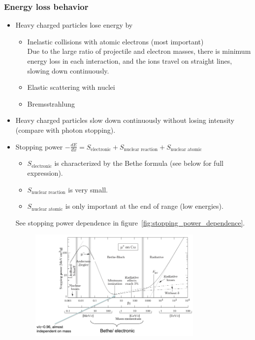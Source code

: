 \subsubsection{Energy loss behavior}
\begin{itemize}
    \item Heavy charged particles lose energy by
    \begin{itemize}
        \item Inelastic collisions with atomic electrons (most important)\\
         Due to the large ratio of projectile and electron masses, there is minimum energy loss in each interaction, and the ions travel on straight lines, slowing down continuously.
        \item Elastic scattering with nuclei
        \item Bremsstrahlung 
    \end{itemize}
    \item Heavy charged particles slow down continuously without losing intensity (compare with photon stopping).
    \item Stopping power $-\frac{dE}{dx}=S_{\text{electronic}}+S_{\text{nuclear reaction}}+S_{\text{nuclear atomic}}$
    \begin{itemize}
        \item $S_{\text{electronic}}$ is characterized by the Bethe formula (see below for full expression).
        \item $S_{\text{nuclear reaction}}$ is very small.
        \item $S_{\text{nuclear atomic}}$ is only important at the end of range (low energies).
    \end{itemize}
    See stopping power dependence in figure~\ref{fig:stopping_power_dependence}.
    \begin{figure}[ht]
        \centering
        \includegraphics[width=0.8\textwidth]{images/stopping_power_dependence.png}

\end{figure}
\end{itemize}
